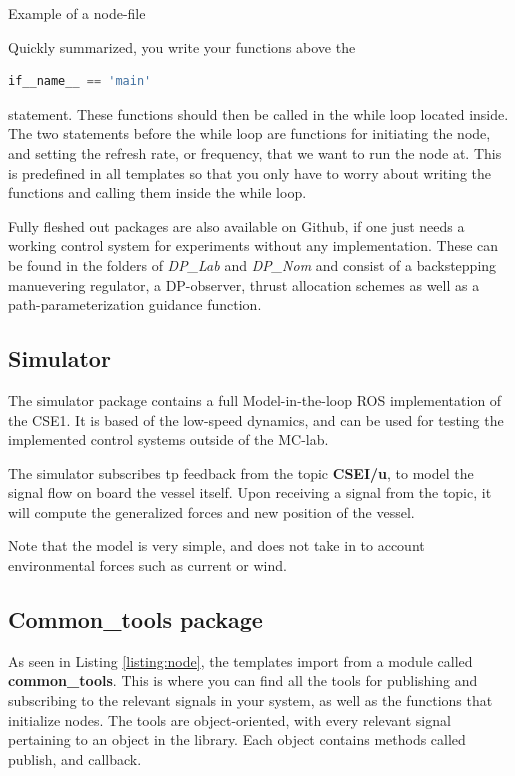 \begin{listing}[h]
\inputminted{python}{feedback_ctrl.py}
\caption{Example of a node-file}
\label{listing:node}
\end{listing}

Quickly summarized, you write your functions above the 

\begin{lstlisting}[language=python]
    if__name__ == 'main'
\end{lstlisting}

statement. These functions should then be called in the while loop located inside. The two statements before the while loop are functions for initiating the node, and setting the refresh rate, or frequency, that we want to run the node at. This is predefined in all templates so that you only have to worry about writing the functions and calling them inside the while loop.

Fully fleshed out packages are also available on Github, if one just needs a working control system for experiments without any implementation. These can be found in the folders of \textit{DP\_Lab} and \textit{DP\_Nom} and consist of a backstepping manuevering regulator, a DP-observer, thrust allocation schemes as well as a path-parameterization guidance function. 

\subsection{Simulator}

The simulator package contains a full Model-in-the-loop ROS implementation of the CSE1. It is based of the low-speed dynamics, and can be used for testing the implemented control systems outside of the MC-lab.

The simulator subscribes tp feedback from the topic \textbf{CSEI/u}, to model the signal flow on board the vessel itself. Upon receiving a signal from the topic, it will compute the generalized forces and new position of the vessel.

Note that the model is very simple, and does not take in to account  environmental forces such as current or wind. 


\subsection{Common\_tools package}

As seen in Listing \ref{listing:node}, the templates import from a module called \textbf{common\_tools}. This is where you can find all the tools for publishing and subscribing to the relevant signals in your system, as well as the functions that initialize nodes. The tools are object-oriented, with every relevant signal pertaining to an object in the library. Each object contains methods called publish, and callback. 

